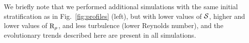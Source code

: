 We briefly note that we performed additional simulations with the same initial stratification as in Fig.~\ref{fig:profiles} (left), but with lower values of $\mathcal{S}$, higher and lower values of $\mathrm{R}_{\rho}$, and less turbulence (lower Reynolds number), and the evolutionary trends described here are present in all simulations.


